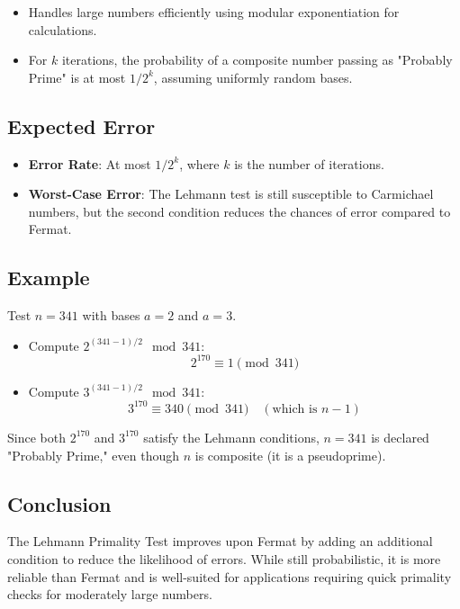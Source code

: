 \documentclass[12pt]{article}
\begin{document}
\begin{itemize}
    \item Handles large numbers efficiently using modular exponentiation for calculations.
    \item For \( k \) iterations, the probability of a composite number passing as "Probably Prime" is at most \( 1 / 2^k \), assuming uniformly random bases.
\end{itemize}

\subsection*{Expected Error}

\begin{itemize}
    \item \textbf{Error Rate}: At most \( 1 / 2^k \), where \( k \) is the number of iterations.
    \item \textbf{Worst-Case Error}: The Lehmann test is still susceptible to Carmichael numbers, but the second condition reduces the chances of error compared to Fermat.
\end{itemize}

\subsection*{Example}

Test \( n = 341 \) with bases \( a = 2 \) and \( a = 3 \).

\begin{itemize}
    \item Compute \( 2^{(341-1)/2} \mod 341 \):
    \[
    2^{170} \equiv 1 \pmod{341}
    \]
    \item Compute \( 3^{(341-1)/2} \mod 341 \):
    \[
    3^{170} \equiv 340 \pmod{341} \quad (\text{which is } n-1)
    \]
\end{itemize}

Since both \( 2^{170} \) and \( 3^{170} \) satisfy the Lehmann conditions, \( n = 341 \) is declared "Probably Prime," even though \( n \) is composite (it is a pseudoprime).

\subsection*{Conclusion}

The Lehmann Primality Test improves upon Fermat by adding an additional condition to reduce the likelihood of errors. While still probabilistic, it is more reliable than Fermat and is well-suited for applications requiring quick primality checks for moderately large numbers.
\end{document}
